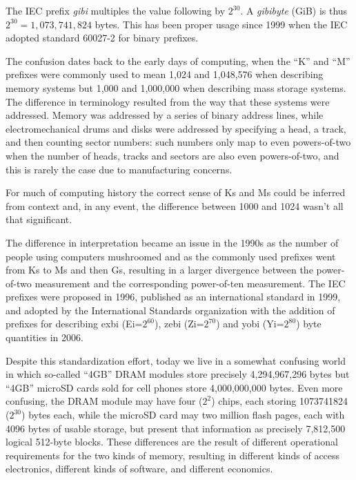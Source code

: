 The IEC prefix \emph{gibi} multiples the value following by $2^{30}$. A \emph{gibibyte}
(GiB) is thus $2^{30}=1,073,741,824$ bytes. This has been proper usage
since 1999 when the IEC adopted standard 60027-2 for binary prefixes.

The confusion dates back to the early days of computing, when the ``K''
and ``M'' prefixes were commonly used to mean 1,024 and 1,048,576
when describing memory systems but 1,000 and 1,000,000 when
describing mass storage systems. The difference in terminology resulted
from the way that these systems were addressed. Memory was addressed
by a series of binary address lines, while electromechanical drums and
disks were addressed by specifying a head, a track, and then counting
sector numbers: such numbers only map to even powers-of-two when the
number of heads, tracks and sectors are also even powers-of-two, and
this is rarely the case due to manufacturing concerns.

For much of computing history the correct sense of Ks and Ms could be
inferred from context and, in any event, the difference between 1000
and 1024 wasn't all that significant.

The difference in interpretation became an issue in the 1990s as the
number of people using computers mushroomed and as the commonly used
prefixes went from Ks to Ms and then Gs, resulting in a larger
divergence between the power-of-two measurement and the corresponding
power-of-ten measurement. The IEC prefixes were proposed in
1996\cite{iec:1996},
published as an international standard in 1999, and adopted by the
International Standards organization with the addition of prefixes for
describing exbi (Ei=$2^{60}$), zebi (Zi=$2^{70}$) and yobi (Yi=$2^{80}$) byte
quantities in 2006\cite{iec:80000-13:2008}.  

Despite this standardization effort, today we live in a somewhat
confusing world in which so-called ``4GB'' DRAM modules 
store precisely 4,294,967,296 bytes
but ``4GB'' microSD cards sold for cell
phones store 4,000,000,000 bytes. Even more confusing, the DRAM
module may have four ($2^{2}$) chips, each storing 1073741824
($2^{30}$) bytes each, while the microSD card may two million flash
pages, each with 4096 bytes of usable storage, but present that
information as precisely 7,812,500 logical 512-byte blocks.  These
differences are the result of different operational requirements for
the two kinds of memory, resulting in different kinds of access
electronics, different kinds of software, and different economics. 


